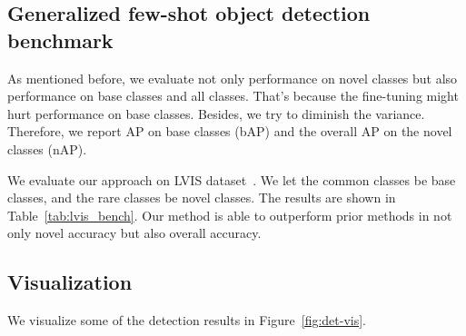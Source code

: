 \subsection{Generalized few-shot object detection benchmark}
\label{sec:revised_bench}
As mentioned before, we evaluate not only performance on novel classes but also performance on base classes and all classes. That's because the fine-tuning might hurt performance on base classes. Besides, we try to diminish the variance. Therefore, we report AP on base classes (bAP) and the overall AP on the novel classes (nAP).

We evaluate our approach on LVIS dataset~\cite{gupta2019lvis}. We let the common classes be base classes, and the rare classes be novel classes. The results are shown in Table~\ref{tab:lvis_bench}. Our method is able to outperform prior methods in not only novel accuracy but also overall accuracy.

\subsection{Visualization}
\label{sec:vis}
We visualize some of the detection results in Figure~\ref{fig:det-vis}.

